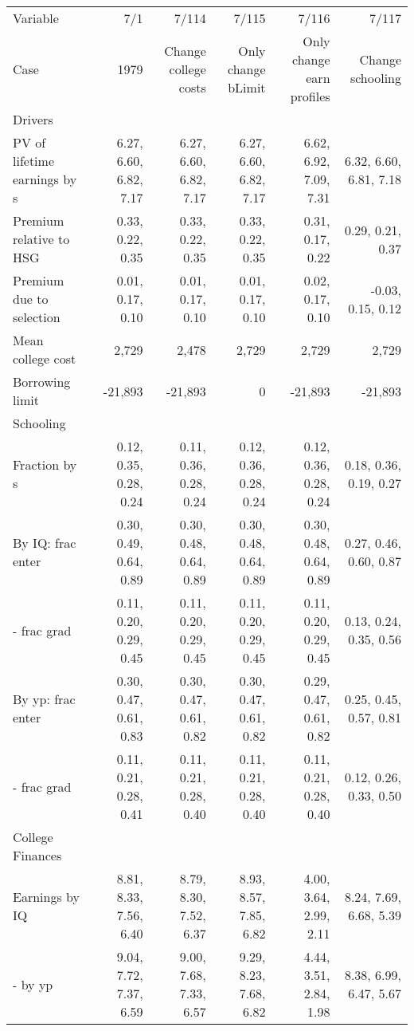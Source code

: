 \begin{tabular}{lrrrrr}
\hline
Variable & 7/1  & 7/114  & 7/115  & 7/116  & 7/117  \\ 
Case & 1979  & Change college costs  & Only change bLimit  & Only change earn profiles  & Change schooling  \\ 
Drivers &   &   &   &   &   \\ 
PV of lifetime earnings by s & 6.27, 6.60, 6.82, 7.17  & 6.27, 6.60, 6.82, 7.17  & 6.27, 6.60, 6.82, 7.17  & 6.62, 6.92, 7.09, 7.31  & 6.32, 6.60, 6.81, 7.18  \\ 
Premium relative to HSG & 0.33, 0.22, 0.35  & 0.33, 0.22, 0.35  & 0.33, 0.22, 0.35  & 0.31, 0.17, 0.22  & 0.29, 0.21, 0.37  \\ 
Premium due to selection & 0.01, 0.17, 0.10  & 0.01, 0.17, 0.10  & 0.01, 0.17, 0.10  & 0.02, 0.17, 0.10  & -0.03, 0.15, 0.12  \\ 
Mean college cost & 2,729  & 2,478  & 2,729  & 2,729  & 2,729  \\ 
Borrowing limit & -21,893  & -21,893  & 0  & -21,893  & -21,893  \\ 
\hline
Schooling &   &   &   &   &   \\ 
Fraction by s & 0.12, 0.35, 0.28, 0.24  & 0.11, 0.36, 0.28, 0.24  & 0.12, 0.36, 0.28, 0.24  & 0.12, 0.36, 0.28, 0.24  & 0.18, 0.36, 0.19, 0.27  \\ 
By IQ: frac enter & 0.30, 0.49, 0.64, 0.89  & 0.30, 0.48, 0.64, 0.89  & 0.30, 0.48, 0.64, 0.89  & 0.30, 0.48, 0.64, 0.89  & 0.27, 0.46, 0.60, 0.87  \\ 
- frac grad & 0.11, 0.20, 0.29, 0.45  & 0.11, 0.20, 0.29, 0.45  & 0.11, 0.20, 0.29, 0.45  & 0.11, 0.20, 0.29, 0.45  & 0.13, 0.24, 0.35, 0.56  \\ 
By yp: frac enter & 0.30, 0.47, 0.61, 0.83  & 0.30, 0.47, 0.61, 0.82  & 0.30, 0.47, 0.61, 0.82  & 0.29, 0.47, 0.61, 0.82  & 0.25, 0.45, 0.57, 0.81  \\ 
- frac grad & 0.11, 0.21, 0.28, 0.41  & 0.11, 0.21, 0.28, 0.40  & 0.11, 0.21, 0.28, 0.40  & 0.11, 0.21, 0.28, 0.40  & 0.12, 0.26, 0.33, 0.50  \\ 
\hline
College Finances &   &   &   &   &   \\ 
Earnings by IQ & 8.81, 8.33, 7.56, 6.40  & 8.79, 8.30, 7.52, 6.37  & 8.93, 8.57, 7.85, 6.82  & 4.00, 3.64, 2.99, 2.11  & 8.24, 7.69, 6.68, 5.39  \\ 
- by yp & 9.04, 7.72, 7.37, 6.59  & 9.00, 7.68, 7.33, 6.57  & 9.29, 8.23, 7.68, 6.82  & 4.44, 3.51, 2.84, 1.98  & 8.38, 6.99, 6.47, 5.67  \\ 

\end{tabular}
